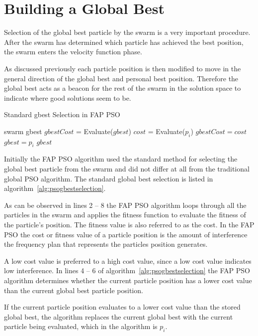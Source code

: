 \section{Building a Global Best}
\label{sec:buildglobalbest}
Selection of the global best particle by the swarm is a very important procedure. After the swarm has determined which particle has achieved the best position, the swarm enters the velocity function phase. 

As discussed previously each particle position is then modified to move in the general direction of the global best and personal best position. Therefore the global best acts as a beacon for the rest of the swarm in the solution space to indicate where good solutions seem to be.

\begin{algorithm}
\caption{Standard gbest Selection in FAP PSO }
\label{alg:psogbestselection}
\begin{algorithmic}[1]
\Require swarm
\Require gbest
\State $gbestCost$ = Evaluate($gbest$)
	\State $cost$ = Evaluate($p_i$)
		\State $gbestCost = cost$
		\State $gbest = p_i$
	\EndIf
\EndFor
\Return $gbest$
\end{algorithmic}
\end{algorithm}

Initially the \gls{FAP} \gls{PSO} algorithm used the standard method for selecting the global best particle from the swarm and did not differ at all from the traditional global \gls{PSO} algorithm. The standard global best selection is listed in algorithm~\ref{alg:psogbestselection}. 

As can be observed in lines 2 -- 8 the \gls{FAP} \gls{PSO} algorithm loops through all the particles in the swarm and applies the fitness function to evaluate the fitness of the particle's position. The fitness value is also referred to as the cost. In the \gls{FAP} \gls{PSO} the cost or fitness value of a particle position is the amount of interference the frequency plan that represents the particles position generates.

A low cost value is preferred to a high cost value, since a low cost value indicates low interference. In lines 4 -- 6 of algorithm~\ref{alg:psogbestselection} the \gls{FAP} \gls{PSO} algorithm determines whether the current particle position has a lower cost value than the current global best particle position.

If the current particle position evaluates to a lower cost value than the stored global best, the algorithm replaces the current global best with the current particle being evaluated, which in the algorithm is $p_i$.

